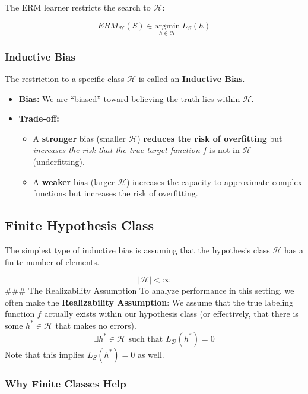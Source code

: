 \documentclass[
  italian,
  11pt,
]{article}
\providecommand{\tightlist}{%
  \setlength{\itemsep}{0pt}\setlength{\parskip}{0pt}}
\begin{document}
The ERM learner restricts the search to \(\mathcal{H}\):

\[ ERM_{\mathcal{H}}(S) \in \underset{h \in \mathcal{H}}{\text{argmin}} \ L_S(h) \]

\subsubsection{Inductive Bias}\label{inductive-bias}

The restriction to a specific class \(\mathcal{H}\) is called an
\textbf{Inductive Bias}.

\begin{itemize}
\tightlist
\item
  \textbf{Bias:} We are ``biased'' toward believing the truth lies
  within \(\mathcal{H}\).
\item
  \textbf{Trade-off:}

  \begin{itemize}
  \tightlist
  \item
    A \textbf{stronger} bias (smaller \(\mathcal{H}\)) \textbf{reduces
    the risk of overfitting} but \emph{increases the risk that the true
    target function} \(f\) is not in \(\mathcal{H}\) (underfitting).
  \item
    A \textbf{weaker} bias (larger \(\mathcal{H}\)) increases the
    capacity to approximate complex functions but increases the risk of
    overfitting.
  \end{itemize}
\end{itemize}

\subsection{Finite Hypothesis Class}\label{finite-hypothesis-class}

The simplest type of inductive bias is assuming that the hypothesis
class \(\mathcal{H}\) has a finite number of elements.

\[ |\mathcal{H}| < \infty \] \#\#\# The Realizability Assumption To
analyze performance in this setting, we often make the
\textbf{Realizability Assumption}: We assume that the true labeling
function \(f\) actually exists within our hypothesis class (or
effectively, that there is some \(h^* \in \mathcal{H}\) that makes no
errors).
\[ \exists h^* \in \mathcal{H} \text{ such that } L_{\mathcal{D}}(h^*) = 0 \]
Note that this implies \(L_S(h^*) = 0\) as well.

\subsubsection{Why Finite Classes Help}\label{why-finite-classes-help}
\end{document}
